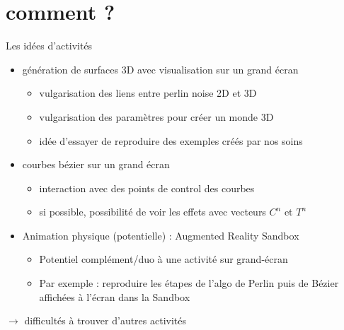 \documentclass{beamer}
\begin{document}
\section{comment ?}	
\begin{frame}{Les idées d'activités}
\begin{itemize}
	\item génération de surfaces 3D avec visualisation sur un grand écran
	\begin{itemize}
		\item vulgarisation des liens entre perlin noise 2D et 3D
		\item vulgarisation des paramètres pour créer un monde 3D
		\item idée d'essayer de reproduire des exemples créés par nos soins
	\end{itemize}
	\item courbes bézier sur un grand écran
	\begin{itemize}
		\item interaction avec des points de control des courbes
		\item si possible, possibilité de voir les effets avec vecteurs $C^n$ et $T^n$ 
	\end{itemize}
	\item Animation physique (potentielle) : Augmented Reality Sandbox
	\begin{itemize}
		\item Potentiel complément/duo à une activité sur grand-écran
		\item Par exemple : reproduire les étapes de l'algo de Perlin puis de Bézier affichées à l'écran dans la Sandbox
	\end{itemize}
\end{itemize}
$\to$ difficultés à trouver d'autres activités
\end{frame}
\end{document}
